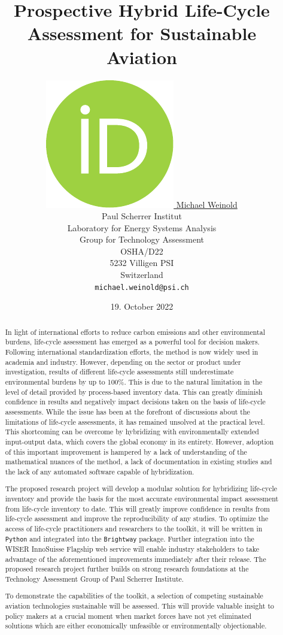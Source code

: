 \documentclass{article}
\title{Prospective Hybrid Life-Cycle Assessment \newline for Sustainable Aviation}
\author{
    \href{https://orcid.org/0000-0003-4859-2650}
    {\includegraphics[scale=0.06]{auxiliary/figures/orcid.pdf}
    \hspace{1mm}
    Michael Weinold} \\
	Paul Scherrer Institut\\
	Laboratory for Energy Systems Analysis\\
	Group for Technology Assessment\\
	OSHA/D22\\
    5232 Villigen PSI \\
    Switzerland \\
	\texttt{michael.weinold@psi.ch} \\
}
\date{19. October 2022}
\begin{document}


\maketitle

\begin{abstract}
    In light of international efforts to reduce carbon emissions and other environmental burdens, life-cycle assessment has emerged as a powerful tool for decision makers. Following international standardization efforts, the method is now widely used in academia and industry. However, depending on the sector or product under investigation, results of different life-cycle assessments still underestimate environmental burdens by up to 100\%. This is due to the natural limitation in the level of detail provided by process-based inventory data. This can greatly diminish confidence in results and negatively impact decisions taken on the basis of life-cycle assessments. While the issue has been at the forefront of discussions about the limitations of life-cycle assessments, it has remained unsolved at the practical level. This shortcoming can be overcome by hybridizing with environmentally extended input-output data, which covers the global economy in its entirety. However, adoption of this important improvement is hampered by a lack of understanding of the mathematical nuances of the method, a lack of documentation in existing studies and the lack of any automated software capable of hybridization.
    
    The proposed research project will develop a modular solution for hybridizing life-cycle inventory and provide the basis for the most accurate environmental impact assessment from life-cycle inventory to date. This will greatly improve confidence in results from life-cycle assessment and improve the reproducibility of any studies. To optimize the access of life-cycle practitioners and researchers to the toolkit, it will be written in \texttt{Python} and integrated into the \texttt{Brightway} package. Further integration into the WISER InnoSuisse Flagship web service will enable industry stakeholders to take advantage of the aforementioned improvements immediately after their release. The proposed research project further builds on strong research foundations at the Technology Assessment Group of Paul Scherrer Institute.
    
    To demonstrate the capabilities of the toolkit, a selection of competing sustainable aviation technologies sustainable will be assessed. This will provide valuable insight to policy makers at a crucial moment when market forces have not yet eliminated solutions which are either economically unfeasible or environmentally objectionable. 
	
\end{abstract}
\end{document}
